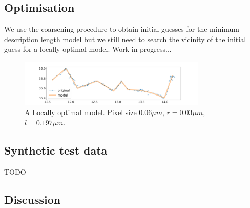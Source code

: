 \documentclass{article}
\begin{document}





\subsection{Optimisation}

We use the coarsening procedure to obtain initial guesses for the minimum description length model but 
we still need to search the vicinity of the initial guess for a locally optimal model.
Work in progress...

\begin{figure}[h]
    \centering
    \includegraphics[width=0.8\textwidth]{candidate_short_mdlmodel.png}
    \caption{A Locally optimal model.  Pixel size $0.06\mu m$, $r = 0.03\mu m$, $l = 0.197\mu m$.
    }
    \label{fig:examplemodel}
\end{figure}


\subsection{Synthetic test data}

TODO

\subsection{Discussion}



\medskip

\printbibliography

\end{document}
